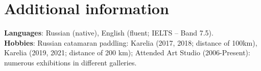 \documentclass[letterpaper,11pt]{article}
\begin{document}

\section{Additional information}
\begin{itemize}[leftmargin=0.15in, label={}]
    \small{\item{
     \textbf{Languages}{: Russian (native), English (fluent; IELTS -- Band 7.5).} \\
     \textbf{Hobbies}{: Russian catamaran paddling: Karelia (2017, 2018; distance of 100km), Karelia (2019, 2021; distance of 200 km); Attended Art Studio (2006-Present): numerous exhibitions in different galleries.} \\
    }}
\end{itemize}
\end{document}
